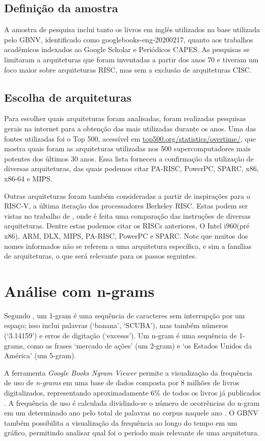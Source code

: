 \documentclass[
	article,			%
	11pt,				%
	oneside,			%
	a4paper,			%
	english,			%
	brazil,				%
	sumario=tradicional
	]{abntex2}
\begin{document}
\subsection{Definição da amostra}
A amostra de pesquisa inclui tanto os livros em inglês utilizados na base utilizada pelo GBNV, identificado como googlebooks-eng-20200217, quanto aos trabalhos acadêmicos indexados ao Google Scholar e Periódicos CAPES. As pesquisas se limitaram a arquiteturas que foram inventadas a partir dos anos 70 e tiveram um foco maior sobre arquiteturas RISC, mas sem a exclusão de arquiteturas CISC.

\subsection{Escolha de arquiteturas}
Para escolher quais arquiteturas foram analisadas, foram realizadas pesquisas gerais na internet para a obtenção das mais utilizadas durante os anos. Uma das fontes utilizadas foi o Top 500, acessível em \url{top500.org/statistics/overtime/}, que mostra quais foram as arquiteturas utilizadas nos 500 supercomputadores mais potentes dos últimos 30 anos. Essa lista forneceu a confirmação da utilização de diversas arquiteturas, das quais podemos citar PA-RISC, PowerPC, SPARC, x86, x86-64 e MIPS. 

Outras arquiteturas foram também consideradas a partir de inspirações para o RISC-V, a última iteração dos processadores Berkeley RISC. Estas podem ser vistas no trabalho de \cite{patterson_risc-v_2016}, onde é feita uma comparação das instruções de diversas arquiteturas. Dentre estas podemos citar os RISCs anteriores, O Intel i960(pré x86), ARM, DLX, MIPS, PA-RISC, PowerPC e SPARC. Note que muitos dos nomes informados não se referem a uma arquitetura específica, e sim a famílias de arquiteturas, o que será relevante para os passos seguintes.

\section{Análise com n-grams}

Segundo , um 1-gram é uma sequência de caracteres sem interrupção por um espaço; isso inclui palavras (‘banana’, ‘SCUBA’), mas também números (‘3.14159’) e erros de digitação (‘excesss’). Um n-gram é uma sequência de 1-grams, como as frases ‘mercado de ações’ (um 2-gram) e ‘os Estados Unidos da América’ (um 5-gram). 

A ferramenta \textit{Google Books Ngram Viewer} permite a visualização da frequência de uso de \textit{n-grams} em uma base de dados composta por 8 milhões de livros digitalizados, representando aproximadamente 6\% de todos os livros já publicados \cite{lin_syntactic_2012}. A frequência de uso é calculada dividindo-se o número de ocorrências do n-gram em um determinado ano pelo total de palavras no corpus naquele ano \cite{michel_quantitative_2011}. O GBNV também possibilita a visualização da frequência ao longo do tempo em um gráfico, permitindo analisar qual foi o período mais relevante de uma arquitetura.
\end{document}
